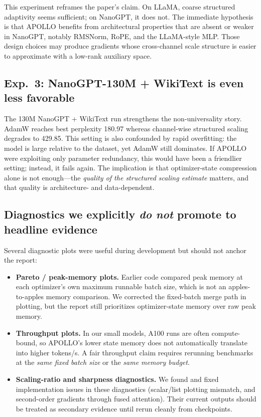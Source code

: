 \documentclass[10pt]{article}
\begin{document}
This experiment reframes the paper's claim. On LLaMA, coarse structured adaptivity seems sufficient; on NanoGPT, it does not. The immediate hypothesis is that APOLLO benefits from architectural properties that are absent or weaker in NanoGPT, notably RMSNorm, RoPE, and the LLaMA-style MLP. Those design choices may produce gradients whose cross-channel scale structure is easier to approximate with a low-rank auxiliary space.

\subsection{Exp.~3: NanoGPT-130M + WikiText is even less favorable}
The 130M NanoGPT + WikiText run strengthens the non-universality story. AdamW reaches best perplexity 180.97 whereas channel-wise structured scaling degrades to 429.85. This setting is also confounded by rapid overfitting: the model is large relative to the dataset, yet AdamW still dominates. If APOLLO were exploiting only parameter redundancy, this would have been a friendlier setting; instead, it fails again. The implication is that optimizer-state compression alone is not enough---the \emph{quality of the structured scaling estimate} matters, and that quality is architecture- and data-dependent.

\subsection{Diagnostics we explicitly \emph{do not} promote to headline evidence}
Several diagnostic plots were useful during development but should not anchor the report:
\begin{itemize}
  \item \textbf{Pareto / peak-memory plots.} Earlier code compared peak memory at each optimizer's own maximum runnable batch size, which is not an apples-to-apples memory comparison. We corrected the fixed-batch merge path in plotting, but the report still prioritizes optimizer-state memory over raw peak memory.
  \item \textbf{Throughput plots.} In our small models, A100 runs are often compute-bound, so APOLLO's lower state memory does not automatically translate into higher tokens/s. A fair throughput claim requires rerunning benchmarks at the \emph{same fixed batch size} or the \emph{same memory budget}.
  \item \textbf{Scaling-ratio and sharpness diagnostics.} We found and fixed implementation issues in these diagnostics (scalar/list plotting mismatch, and second-order gradients through fused attention). Their current outputs should be treated as secondary evidence until rerun cleanly from checkpoints.
\end{itemize}
\end{document}
